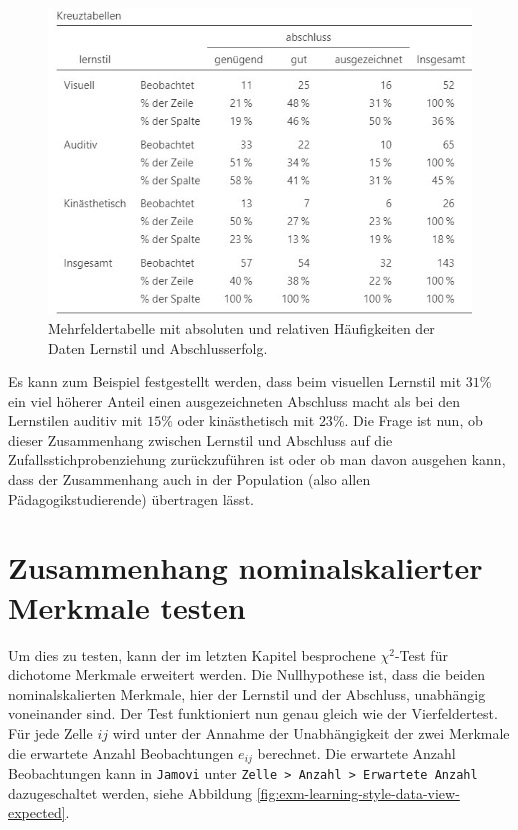 \documentclass[
]{book}
\theoremstyle{definition}
\theoremstyle{definition}
\theoremstyle{definition}
\theoremstyle{definition}
\theoremstyle{remark}
\begin{document}
\begin{figure}

{\centering \includegraphics{figures/10-exm-learning-style-data-view-rel} 

}

\caption{Mehrfeldertabelle mit absoluten und relativen Häufigkeiten der Daten Lernstil und Abschlusserfolg.}\label{fig:exm-learning-style-data-view-rel}
\end{figure}

Es kann zum Beispiel festgestellt werden, dass beim visuellen Lernstil mit \(31\%\) ein viel höherer Anteil einen ausgezeichneten Abschluss macht als bei den Lernstilen auditiv mit \(15\%\) oder kinästhetisch mit \(23\%\). Die Frage ist nun, ob dieser Zusammenhang zwischen Lernstil und Abschluss auf die Zufallsstichprobenziehung zurückzuführen ist oder ob man davon ausgehen kann, dass der Zusammenhang auch in der Population (also allen Pädagogikstudierende) übertragen lässt.

\section{Zusammenhang nominalskalierter Merkmale testen}\label{zusammenhang-nominalskalierter-merkmale-testen}

Um dies zu testen, kann der im letzten Kapitel besprochene \(\chi^2\)-Test für dichotome Merkmale erweitert werden. Die Nullhypothese ist, dass die beiden nominalskalierten Merkmale, hier der Lernstil und der Abschluss, unabhängig voneinander sind. Der Test funktioniert nun genau gleich wie der Vierfeldertest. Für jede Zelle \(ij\) wird unter der Annahme der Unabhängigkeit der zwei Merkmale die erwartete Anzahl Beobachtungen \(e_{ij}\) berechnet. Die erwartete Anzahl Beobachtungen kann in \texttt{Jamovi} unter \texttt{Zelle\ \textgreater{}\ Anzahl\ \textgreater{}\ Erwartete\ Anzahl} dazugeschaltet werden, siehe Abbildung \ref{fig:exm-learning-style-data-view-expected}.
\end{document}
